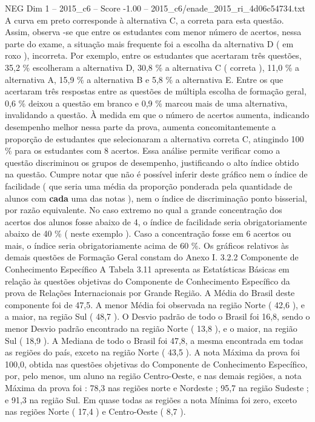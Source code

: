 \begin{textsample}{NEG Dim 1 – 2015\_c6 – Score -1.00 – 2015\_c6/enade\_2015\_ri\_4d06c54734.txt}
A curva em preto corresponde à alternativa C, a correta para esta questão.
Assim, observa -se que entre os estudantes com menor número de acertos, nessa parte do exame, a situação mais frequente foi a escolha da alternativa D ( em roxo ), incorreta.
Por exemplo, entre os estudantes que acertaram três questões, 35,2 \% escolheram a alternativa D, 30,8 \% a alternativa C ( correta ), 11,0 \% a alternativa A, 15,9 \% a alternativa B e 5,8 \% a alternativa E.
Entre os que acertaram três respostas entre as questões de múltipla escolha de formação geral, 0,6 \% deixou a questão em branco e 0,9 \% marcou mais de uma alternativa, invalidando a questão.
À medida em que o número de acertos aumenta, indicando desempenho melhor nessa parte da prova, aumenta concomitantemente a proporção de estudantes que selecionaram a alternativa correta C, atingindo 100 \% para os estudantes com 8 acertos.
Essa análise permite verificar como a questão discriminou os grupos de desempenho, justificando o alto índice obtido na questão.
Cumpre notar que não é possível inferir deste gráfico nem o índice de facilidade ( que seria uma média da proporção ponderada pela quantidade de alunos com \textbf{cada} uma das notas ), nem o índice de discriminação ponto bisserial, por razão equivalente.
No caso extremo no qual a grande concentração dos acertos dos alunos fosse abaixo de 4, o índice de facilidade seria obrigatoriamente abaixo de 40 \% ( neste exemplo ).
Caso a concentração fosse em 6 acertos ou mais, o índice seria obrigatoriamente acima de 60 \%.
Os gráficos relativos às demais questões de Formação Geral constam do Anexo I. 3.2.2 Componente de Conhecimento Específico A Tabela 3.11 apresenta as Estatísticas Básicas em relação às questões objetivas do Componente de Conhecimento Específico da prova de Relações Internacionais por Grande Região.
A Média do Brasil deste componente foi de 47,5.
A menor Média foi observada na região Norte ( 42,6 ), e a maior, na região Sul ( 48,7 ).
O Desvio padrão de todo o Brasil foi 16,8, sendo o menor Desvio padrão encontrado na região Norte ( 13,8 ), e o maior, na região Sul ( 18,9 ).
A Mediana de todo o Brasil foi 47,8, a mesma encontrada em todas as regiões do país, exceto na região Norte ( 43,5 ).
A nota Máxima da prova foi 100,0, obtida nas questões objetivas do Componente de Conhecimento Específico, por, pelo menos, um aluno na região Centro-Oeste, e nas demais regiões, a nota Máxima da prova foi : 78,3 nas regiões norte e Nordeste ; 95,7 na região Sudeste ; e 91,3 na região Sul.
Em quase todas as regiões a nota Mínima foi zero, exceto nas regiões Norte ( 17,4 ) e Centro-Oeste ( 8,7 ).

\end{textsample}
